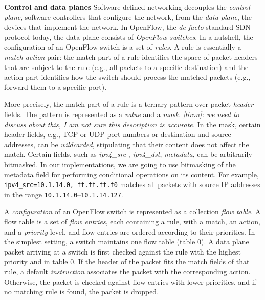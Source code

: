 \documentclass[conference]{sigcomm-alternate}
\newcommand{\liron}[1]{\textit{\textcolor{mygreen}{[liron]: #1}}} %
\begin{document}

\noindent\textbf{Control and data planes}
Software-defined networking decouples the \emph{control plane}, software
controllers that configure the network, from the \emph{data plane}, the
devices that implement the network.
%
In OpenFlow, the \emph{de facto} standard SDN protocol
today, the data plane consists of \emph{OpenFlow switches}.
In a nutshell, the configuration of an OpenFlow switch is a set of
\emph{rules}.
A rule is essentially a \emph{match-action} pair:
the match part of a rule identifies the space of packet headers that are
subject to the rule (e.g., all packets to a specific destination) and
the action part identifies how the switch should process the matched
packets (e.g., forward them to a specific port).

More precisely, the match part of a rule is
a ternary pattern over packet \emph{header} fields.
The pattern is represented as a \emph{value} and a \emph{mask}. \liron{we need to discuss about this, I am not sure this description is accurate.}
In the mask, certain header fields, e.g., TCP or UDP port numbers or destination and source
addresses, can be \emph{wildcarded}, stipulating that their content does
not affect the match.
Certain fields, such as \emph{ipv4\_src }, \emph{ipv4\_dst}, \emph{metadata}, can be arbitrarily
bitmasked.
In our implementations, we are going to use bitmasking of the metadata
field for performing conditional operations on  its content.
For example, \texttt{ipv4\_src=10.1.14.0, ff.ff.ff.f0} matches all packets
with source IP addresses in the range \texttt{10.1.14.0}--\texttt{10.1.14.127}.

A \emph{configuration} of an OpenFlow switch is represented as a
collection \emph{flow table}.
A flow table is a set of \emph{flow entries}, each containing a rule,
with a match, an action, and a \emph{priority} level, and flow entries
are ordered according to their priorities.
In the simplest setting, a switch maintains one flow table (table 0).
A data plane packet arriving at a switch is first checked against
the rule with the highest priority and in table $0$.
If the header of the packet fits the match fields of that rule,
a default \emph{instruction} associates the packet with the corresponding action.
Otherwise, the packet is checked against flow  entries with lower
priorities, and if no matching rule is found, the packet is dropped.
\end{document}
